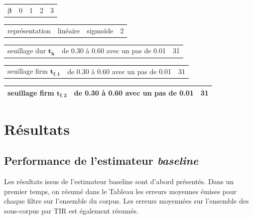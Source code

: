 \begin{table}[t]
\begin{tabularx}{17.5cm}{L{3cm}@{}C{4cm}@{}@{}C{4cm}@{}@{}C{4cm}@{}C{2cm}@{}}
   $\mathbf{\beta}$ & 0 & 1 & 2 & 3\\
\end{tabularx}

\begin{tabularx}{17.5cm}{L{3cm}@{}C{6cm}@{}@{}C{6cm}@{}C{2cm}@{}}
   représentation & linéaire & sigmoïde & 2\\
\end{tabularx}

\begin{tabularx}{17.5cm}{L{3cm}@{}C{12cm}@{}C{2cm}@{}}
	seuillage dur $\mathbf{t_h}$ & de 0.30 à 0.60 avec un pas de 0.01 & 31\\
\end{tabularx}

\begin{tabularx}{17.5cm}{L{3cm}@{}C{12cm}@{}C{2cm}@{}}
   seuillage firm $\mathbf{t_{f,1}}$ & de 0.30 à 0.60 avec un pas de 0.01 & 31\\
\end{tabularx}

\begin{tabularx}{17.5cm}{L{3cm}@{}C{12cm}@{}C{2cm}@{}}
   seuillage firm $\mathbf{t_{f,2}}$ & de 0.30 à 0.60 avec un pas de 0.01 & 31\\
   \bottomrule
\end{tabularx}

\label{tab:experimental_factorsNMF_ambiance}
\end{table}

\section{Résultats}


\subsection{Performance de l'estimateur \textit{baseline}}

Les résultats issus de l'estimateur baseline sont d'abord présentés. Dans un premier temps, on résumé dans le Tableau les erreurs moyennes émises pour chaque filtre sur l'ensemble du corpus. Les erreurs moyennées sur l'ensemble des sous-corpus par TIR est également résumés. 

